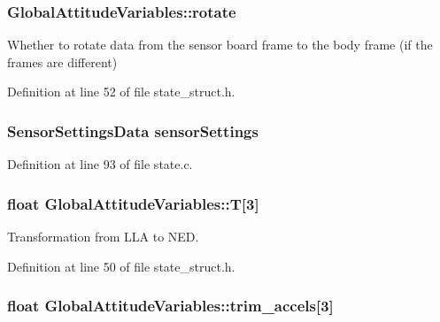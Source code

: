 \hypertarget{group___state_gad5da7bf77c18e9d5990d4b6d6f28477e}{
\subsubsection[{rotate}]{ Global\-Attitude\-Variables\-::rotate}}\label{group___state_gad5da7bf77c18e9d5990d4b6d6f28477e}


Whether to rotate data from the sensor board frame to the body frame (if the frames are different) 



Definition at line 52 of file state\-\_\-struct.\-h.

\hypertarget{group___state_ga7e2b26cdc0322ab9457559aa2b94f8fc}{
\subsubsection[{sensor\-Settings}]{\setlength{\rightskip}{0pt plus 5cm}Sensor\-Settings\-Data sensor\-Settings}}\label{group___state_ga7e2b26cdc0322ab9457559aa2b94f8fc}


Definition at line 93 of file state.\-c.

\hypertarget{group___state_ga45b3fda0427f0fab27b88df83ae9108d}{
\subsubsection[{T}]{\setlength{\rightskip}{0pt plus 5cm}float Global\-Attitude\-Variables\-::\-T\mbox{[}3\mbox{]}}}\label{group___state_ga45b3fda0427f0fab27b88df83ae9108d}


Transformation from L\-L\-A to N\-E\-D. 



Definition at line 50 of file state\-\_\-struct.\-h.

\hypertarget{group___state_ga8941c16a263cb020587ef58dd38f8281}{
\subsubsection[{trim\-\_\-accels}]{\setlength{\rightskip}{0pt plus 5cm}float Global\-Attitude\-Variables\-::trim\-\_\-accels\mbox{[}3\mbox{]}}}\label{group___state_ga8941c16a263cb020587ef58dd38f8281}


